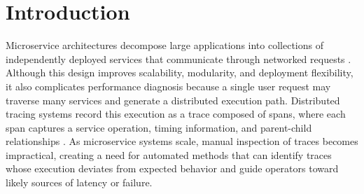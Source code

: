 \section{Introduction}
\label{sec:introduction}

Microservice architectures decompose large applications into collections of independently deployed services that communicate through networked requests  \cite{dragoni2017microservices}. Although this design improves scalability, modularity, and deployment flexibility, it also complicates performance diagnosis because a single user request may traverse many services and generate a distributed execution path. Distributed tracing systems record this execution as a trace composed of spans, where each span captures a service operation, timing information, and parent-child relationships \cite{sigelman2010dapper}. As microservice systems scale, manual inspection of traces becomes impractical, creating a need for automated methods that can identify traces whose execution deviates from expected behavior and guide operators toward likely sources of latency or failure.

